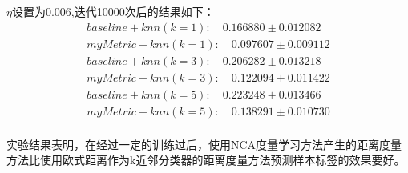 \documentclass[a4paper,UTF8]{article}
\theoremstyle{definition}
\renewcommand\refname{参考文献}
\begin{document}
		$\eta$设置为0.006,迭代10000次后的结果如下：
		\begin{align*}
		baseline+knn(k=1): \quad	0.166880 ± 0.012082\\
		myMetric+knn(k=1): \quad	0.097607 ± 0.009112\\
		baseline+knn(k=3): \quad	0.206282 ± 0.013218\\
		myMetric+knn(k=3): \quad	0.122094 ± 0.011422\\
		baseline+knn(k=5): \quad	0.223248 ± 0.013466\\
		myMetric+knn(k=5): \quad	0.138291 ± 0.010730\\
		\end{align*}
		
		
		实验结果表明，在经过一定的训练过后，使用NCA度量学习方法产生的距离度量方法比使用欧式距离作为k近邻分类器的距离度量方法预测样本标签的效果要好。
	
\renewcommand\refname{参考文献}

	
\end{document}
